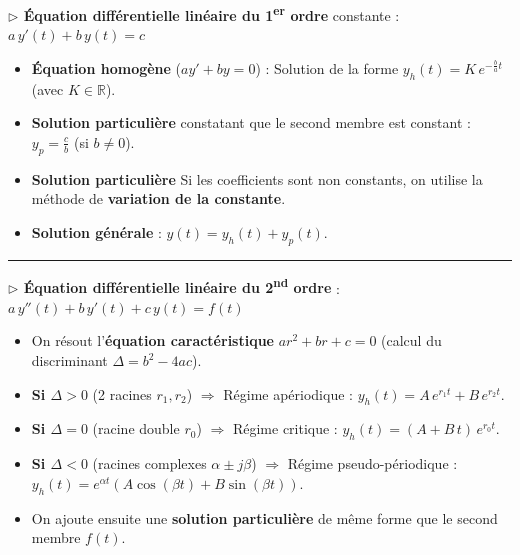 \documentclass[a4paper,11pt]{article}
\begin{document}
\begin{tcolorbox}[
  colback=white,
  colframe=uimmblue!80!black,
  title={\textbf{\textsf{Rappels Essentiels -- Ordre 1 et Ordre 2}}},
  fonttitle=\large\bfseries\color{white},
  coltitle=white,
  boxrule=1pt,
  arc=4pt,
  left=10pt, right=10pt, top=8pt, bottom=8pt
]

\textbf{\color{uimmblue} $\triangleright$ Équation différentielle linéaire du 1\textsuperscript{er} ordre} constante : $a\,y'(t) + b\,y(t) = c$
\begin{itemize}[leftmargin=1cm, itemsep=2pt, topsep=2pt]
  \item \textbf{Équation homogène} ($ay' + by = 0$) : Solution de la forme $y_h(t) = K\,e^{-\frac{b}{a}t}$ (avec $K \in \mathbb{R}$).
  \item \textbf{Solution particulière} constatant que le second membre est constant : $y_p = \frac{c}{b}$ (si $b \neq 0$).
  \item \textbf{Solution particulière} Si les coefficients sont non constants, on utilise la méthode de \textbf{variation de la constante}.
  \item \textbf{Solution générale} : $y(t) = y_h(t) + y_p(t)$.
\end{itemize}

\vspace{4pt}
{\color{uimmblue}\rule{\linewidth}{0.5pt}}
\vspace{4pt}

\textbf{\color{uimmblue} $\triangleright$ Équation différentielle linéaire du 2\textsuperscript{nd} ordre} : $a\,y''(t) + b\,y'(t) + c\,y(t) = f(t)$
\begin{itemize}[leftmargin=1cm, itemsep=2pt, topsep=2pt]
  \item On résout l'\textbf{équation caractéristique} $ar^2 + br + c = 0$ (calcul du discriminant $\Delta = b^2 - 4ac$).
  \item \textbf{Si $\Delta > 0$} (2 racines $r_1, r_2$) $\Rightarrow$ Régime apériodique : $y_h(t) = A\,e^{r_1 t} + B\,e^{r_2 t}$.
  \item \textbf{Si $\Delta = 0$} (racine double $r_0$) $\Rightarrow$ Régime critique : $y_h(t) = (A + B\,t)\,e^{r_0 t}$.
  \item \textbf{Si $\Delta < 0$} (racines complexes $\alpha \pm j\beta$) $\Rightarrow$ Régime pseudo-périodique : $y_h(t) = e^{\alpha t}\left(A\cos(\beta t) + B\sin(\beta t)\right)$.
  \item On ajoute ensuite une \textbf{solution particulière} de même forme que le second membre $f(t)$.
\end{itemize}
\end{tcolorbox}
\end{document}
